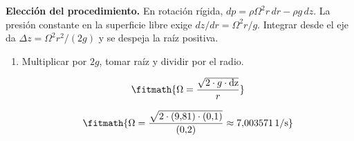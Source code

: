 \noindent\textbf{Elección del procedimiento.} En rotación rígida, $dp=\rho\Omega^2r\,dr-\rho g\,dz$. La presión constante en la superficie libre exige $dz/dr=\Omega^2r/g$. Integrar desde el eje da $\Delta z=\Omega^2r^2/(2g)$ y se despeja la raíz positiva.

\begin{enumerate}

\item Multiplicar por $2g$, tomar raíz y dividir por el radio.

\[\fitmath{\Omega=\frac{\sqrt{2\cdot g\cdot \mathrm{dz}}}{r}}\]

\[\fitmath{\Omega=\frac{\sqrt{2\cdot (9{,}81)\cdot (0{,}1)}}{(0{,}2)}\approx 7{,}003571\,\mathrm{1/s}}\]

\end{enumerate}
